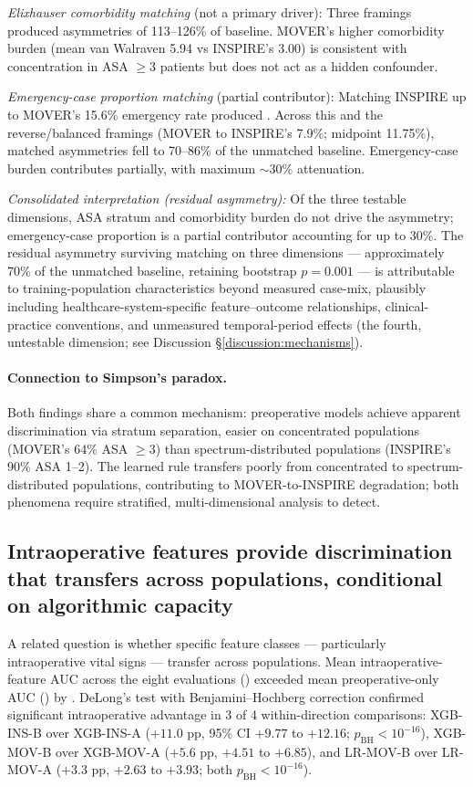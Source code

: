 \emph{Elixhauser comorbidity matching} (not a primary driver): Three framings produced asymmetries of 113--126\% of baseline. MOVER's higher comorbidity burden (mean van Walraven 5.94 vs INSPIRE's 3.00) is consistent with concentration in ASA $\geq 3$ patients but does not act as a hidden confounder.

\emph{Emergency-case proportion matching} (partial contributor): Matching INSPIRE up to MOVER's 15.6\% emergency rate produced \pnMatchedAsymmetryEmergencyMatchMoverPropFullSlim. Across this and the reverse/balanced framings (MOVER to INSPIRE's 7.9\%; midpoint 11.75\%), matched asymmetries fell to 70--86\% of the unmatched baseline. Emergency-case burden contributes partially, with maximum $\sim 30\%$ attenuation.

\emph{Consolidated interpretation (residual asymmetry):} Of the three testable dimensions, ASA stratum and comorbidity burden do not drive the asymmetry; emergency-case proportion is a partial contributor accounting for up to 30\%. The residual asymmetry surviving matching on three dimensions --- approximately 70\% of the unmatched baseline, retaining bootstrap $p = 0.001$ --- is attributable to training-population characteristics beyond measured case-mix, plausibly including healthcare-system-specific feature--outcome relationships, clinical-practice conventions, and unmeasured temporal-period effects (the fourth, untestable dimension; see Discussion \S\ref{discussion:mechanisms}).

\paragraph{Connection to Simpson's paradox.} Both findings share a common mechanism: preoperative models achieve apparent discrimination via stratum separation, easier on concentrated populations (MOVER's 64\% ASA $\geq 3$) than spectrum-distributed populations (INSPIRE's 90\% ASA 1--2). The learned rule transfers poorly from concentrated to spectrum-distributed populations, contributing to MOVER-to-INSPIRE degradation; both phenomena require stratified, multi-dimensional analysis to detect.

\subsection{Intraoperative features provide discrimination that transfers across populations, conditional on algorithmic capacity}
\label{sec:results:intraop}

A related question is whether specific feature classes --- particularly intraoperative vital signs --- transfer across populations. Mean intraoperative-feature AUC across the eight evaluations (\pnMeanIntraopAuc) exceeded mean preoperative-only AUC (\pnMeanPreopAuc) by \pnMeanIntraopAdvantageFull. DeLong's test with Benjamini--Hochberg correction confirmed significant intraoperative advantage in 3 of 4 within-direction comparisons: XGB-INS-B over XGB-INS-A ($+11.0$ pp, 95\% CI $+9.77$ to $+12.16$; $p_{\text{BH}} < 10^{-16}$), XGB-MOV-B over XGB-MOV-A ($+5.6$ pp, $+4.51$ to $+6.85$), and LR-MOV-B over LR-MOV-A ($+3.3$ pp, $+2.63$ to $+3.93$; both $p_{\text{BH}} < 10^{-16}$).

